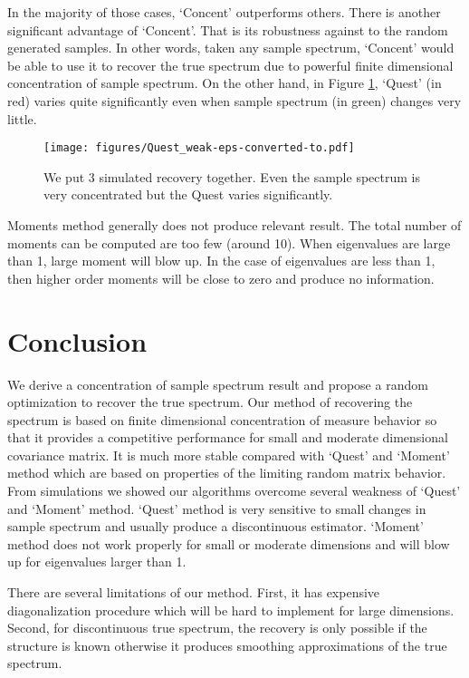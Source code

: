 \documentclass[12pt]{extarticle}
\newcommand{\1}{\field{1}}
\numberwithin{equation}{section}
\begin{document}
In the majority of those cases, `Concent'  outperforms others. There is another significant advantage of `Concent'. That is its robustness against to the random generated samples. In other words, taken any sample spectrum, `Concent' would be able to use it to recover the true spectrum due to powerful finite dimensional concentration of sample spectrum. On the other hand, in Figure \ref{fig:Quest weak}, `Quest' (in red) varies quite significantly even when sample spectrum (in green) changes very little.

\begin{figure}[H] 
    \centering
	\texttt{[image: figures/Quest\_weak-eps-converted-to.pdf]}
	\caption{We put 3 simulated recovery together. Even the sample spectrum is very concentrated but the Quest varies significantly.}\label{fig:Quest weak}
\end{figure}
Moments method generally does not produce relevant result.  The total number of moments can be computed are too few (around 10). When eigenvalues are large than 1, large moment will blow up. In the case of eigenvalues are less than 1, then higher order moments will be close to zero and produce no information. 







\section{Conclusion}
  We derive a concentration of sample spectrum result and propose a random optimization to recover the true spectrum. Our method of recovering the spectrum is based on finite dimensional concentration of measure behavior so that it provides a competitive performance for small and moderate dimensional covariance matrix. It is much more stable compared with `Quest' and `Moment' method  which are based on properties of the limiting random matrix behavior. From simulations we showed our algorithms overcome several weakness of `Quest' and `Moment' method. `Quest' method is very sensitive to small changes in sample spectrum and usually produce a discontinuous estimator. `Moment' method does not work properly for small or moderate dimensions and will blow up for eigenvalues larger than 1. 

There are several limitations of our method. First, it has expensive diagonalization procedure which will be hard to implement for large dimensions. Second, for discontinuous true spectrum, the recovery is only possible if the structure is known otherwise it produces smoothing approximations of the true spectrum.






\end{document}
